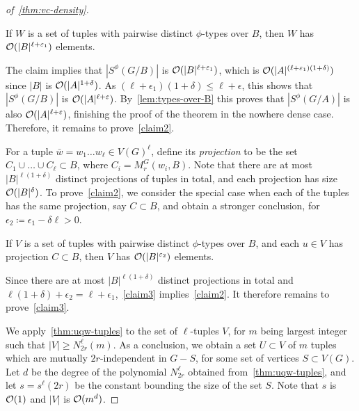 \begin{proof}[of~\cref{thm:vc-density}]
	
	\setcounter{claim}{0}
\begin{claim}\label{claim2}
	If $W$ is a set of tuples with pairwise distinct $\phi$-types over $B$, then	
	 $W$ has  	$\mathcal{O}(|B|^{\ell+\varepsilon_1})$ elements.
\end{claim}	
The claim implies that $|S^\phi(G/B)|$ is $\mathcal{O}(|B|^{\ell+\varepsilon_1})$, which is $\mathcal{O}(|A|^{(\ell+\varepsilon_1)(1+\delta)})$ since $|B|$ is $\mathcal{O}(|A|^{1+\delta})$. As $(\ell+\epsilon_1)(1+\delta)\le \ell+\epsilon$, this shows that $|S^\phi(G/B)|$
is $\mathcal{O}(|A|^{\ell+\varepsilon})$.
By~\cref{lem:types-over-B} this proves that $|S^\phi(G/A)|$ is also $\mathcal{O}(|A|^{\ell+\varepsilon})$, finishing the proof of the theorem in the nowhere dense case.
	Therefore, it remains to prove~\cref{claim2}.

	
	

\medskip  
For a tuple $\bar w=w_1\ldots w_\ell\in V(G)^\ell$, define its \emph{projection}
to be the set $C_1\cup\ldots\cup C_\ell\subset B$, where  
$C_i=M^G_r(w_i, B)$. Note that there are at most 
$|B|^{\ell(1+\delta)}$ distinct projections of tuples in total, and each projection has size $\mathcal{O}(|B|^\delta)$.
To prove~\cref{claim2}, we  consider the special case when each of the tuples has the same projection, say $C\subset B$, and  obtain a stronger conclusion,
for $\epsilon_2\coloneqq \epsilon_1-\delta\ell>0$.
\begin{claim}\label{claim3}
	If $V$ is a set of tuples with pairwise distinct $\phi$-types over $B$, and each $u\in V$ has projection $C\subset B$, then	
	 $V$ has   	$\mathcal{O}(|B|^{\varepsilon_2})$ elements.
\end{claim}
Since there are at most $|B|^{\ell(1+\delta)}$ distinct projections in total and $\ell(1+\delta)+\epsilon_2=\ell+\epsilon_1$,~\cref{claim3} implies~\cref{claim2}. It therefore remains to prove~\cref{claim3}.

\medskip
We apply~\cref{thm:uqw-tuples} to the set of $\ell$-tuples $V$, for $m$ being largest integer such that $|V|\ge N^{\ell}_{2r}(m)$.
  As a conclusion, we obtain a set $U\subset V$  of $m$ tuples which are mutually $2r$-independent in $G-S$, for some set of vertices $S\subset V(G)$.
  Let $d$ be the degree of the polynomial 
 $N^\ell_{2r}$ obtained from~\cref{thm:uqw-tuples},
    and let $s=s^{\ell}(2r)$ be the constant bounding the size of the set $S$.
      Note that $s$ is $\mathcal{O}(1)$ and $|V|$ is $\mathcal{O}(m^d)$.
  

\end{proof}
